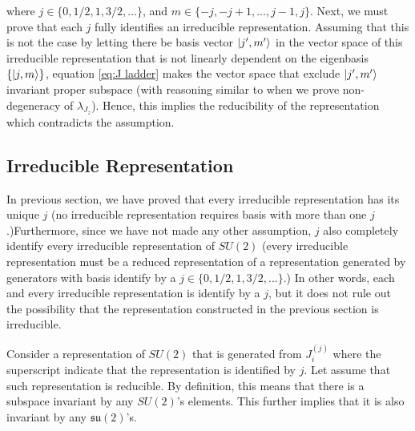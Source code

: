 \documentclass[preprint, 12pt]{revtex4-2}
\numberwithin{equation}{section}
\begin{document}
where $j \in \{0, 1/2, 1, 3/2, ...\}$, and $m \in \{-j, -j+1, ..., j-1, j\}$. Next, we must prove that each $j$ fully identifies an irreducible representation. Assuming that this is not the case by letting there be basis vector $\ket{j', m'}$ in the vector space of this irreducible representation that is not linearly dependent on the eigenbasis $\{\ket{j,m}\}$, equation \ref{eq:J ladder} makes the vector space that exclude $\ket{j', m'}$ invariant proper subspace (with reasoning similar to when we prove non-degeneracy of $\lambda_{J_z}$). Hence, this implies the reducibility of the representation which contradicts the assumption. 

\subsection{Irreducible Representation}
In previous section, we have proved that every irreducible representation has its unique $j$ (no irreducible representation requires basis with more than one $j$.)Furthermore, since we have not made any other assumption, $j$ also completely identify every irreducible representation of $SU(2)$ (every irreducible representation must be a reduced representation of a representation generated by generators with basis identify by a $j \in \{0, 1/2, 1, 3/2, ...\}$.) In other words, each and every irreducible representation is identify by a $j$, but it does not rule out the possibility that the representation constructed in the previous section is irreducible.

Consider a representation of $SU(2)$ that is generated from  $J^{(j)}_i$ where the superscript indicate that the representation is identified by $j$. Let assume that such representation is reducible. By definition, this means that there is a subspace invariant by any $SU(2)$'s elements. This further implies that it is also invariant by any $\mathfrak{su(2)}$'s. 
\end{document}
